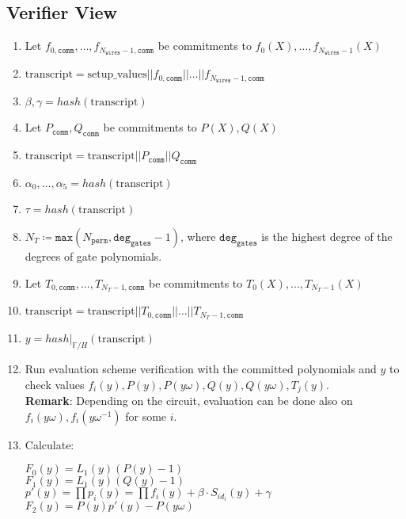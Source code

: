 \subsection{Verifier View}

\begin{enumerate}
	\item Let $f_{0, \texttt{comm}}, \dots, f_{N_{\texttt{wires}} - 1, \texttt{comm}}$ be commitments to $f_{0}(X), \dots, f_{N_{\texttt{wires}} - 1}(X)$
    \item $\text{transcript} = \text{setup\_values} || f_{0, \texttt{comm}} || \dots || f_{N_{\texttt{wires}} - 1, \texttt{comm}}$
    \item $\beta, \gamma = hash(\text{transcript})$
    \item Let $P_{\texttt{comm}}, Q_{\texttt{comm}}$ be commitments to $P(X), Q(X)$
    \item $\text{transcript} = \text{transcript} || P_{\texttt{comm}} || Q_{\texttt{comm}}$
    \item $\alpha_0, \dots, \alpha_5 = hash(\text{transcript})$
    \item $\tau = hash(\text{transcript})$
    \item $N_T \coloneqq \texttt{max}(N_{\texttt{perm}}, \texttt{deg}_{\texttt{gates}} - 1)$, 
		where $\texttt{deg}_{\texttt{gates}}$ is the highest degree of the degrees of gate polynomials. 
    \item Let $T_{0, \texttt{comm}}, ..., T_{N_T - 1, \texttt{comm}}$ be commitments to $T_0(X), ..., T_{N_T - 1}(X)$
    \item $\text{transcript} = \text{transcript} || T_{0, \texttt{comm}} || ... || T_{N_T - 1, \texttt{comm}}$
    \item $y = hash|_{\mathbb{F}/H}(\text{transcript})$
    \item Run evaluation scheme verification with the committed polynomials and $y$ to check values
    $f_i(y), P(y), P(y\omega), Q(y), Q(y\omega), T_j(y)$.  \\
    \textbf{Remark}: Depending on the circuit, evaluation can be done also on $f_i(y\omega), f_i(y\omega^{-1})$ for some $i$.
    \item Calculate:
    \begin{center}
        $F_0(y) = L_1(y)(P(y) - 1)$ \\
        $F_1(y) = L_1(y)(Q(y) - 1)$ \\
        $p'(y) = \prod p_i(y) = \prod f_i(y) + \beta \cdot S_{id_i}(y) + \gamma$ \\
        $F_2(y) = P(y)p'(y) - P(y\omega)$ \\

\end{center}
\end{enumerate}
